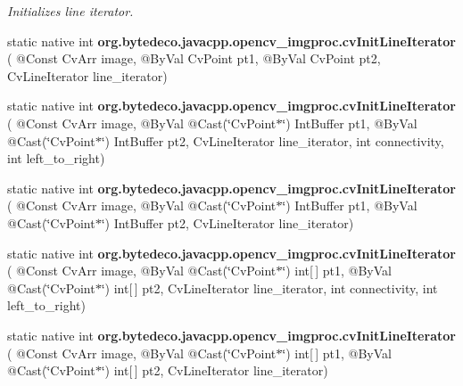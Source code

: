 \begin{DoxyCompactItemize}
\begin{DoxyCompactList}\small\item\em Initializes line iterator. \end{DoxyCompactList}\item 
\mbox{\label{group__imgproc__c_ga90c0091612a5abc5a45bf91675dbde58}} 
static native int {\bfseries org.\+bytedeco.\+javacpp.\+opencv\+\_\+imgproc.\+cv\+Init\+Line\+Iterator} ( @Const Cv\+Arr image, @By\+Val Cv\+Point pt1, @By\+Val Cv\+Point pt2, Cv\+Line\+Iterator line\+\_\+iterator)
\item 
\mbox{\label{group__imgproc__c_gaf96639dddc5c8279e8834a9a41acecb8}} 
static native int {\bfseries org.\+bytedeco.\+javacpp.\+opencv\+\_\+imgproc.\+cv\+Init\+Line\+Iterator} ( @Const Cv\+Arr image, @By\+Val @Cast(\char`\"{}Cv\+Point$\ast$\char`\"{}) Int\+Buffer pt1, @By\+Val @Cast(\char`\"{}Cv\+Point$\ast$\char`\"{}) Int\+Buffer pt2, Cv\+Line\+Iterator line\+\_\+iterator, int connectivity, int left\+\_\+to\+\_\+right)
\item 
\mbox{\label{group__imgproc__c_ga050110d15454b41fbfbdba6b54a084c4}} 
static native int {\bfseries org.\+bytedeco.\+javacpp.\+opencv\+\_\+imgproc.\+cv\+Init\+Line\+Iterator} ( @Const Cv\+Arr image, @By\+Val @Cast(\char`\"{}Cv\+Point$\ast$\char`\"{}) Int\+Buffer pt1, @By\+Val @Cast(\char`\"{}Cv\+Point$\ast$\char`\"{}) Int\+Buffer pt2, Cv\+Line\+Iterator line\+\_\+iterator)
\item 
\mbox{\label{group__imgproc__c_gac4c7b1bbeb0ee95be85d6bc16db1f0df}} 
static native int {\bfseries org.\+bytedeco.\+javacpp.\+opencv\+\_\+imgproc.\+cv\+Init\+Line\+Iterator} ( @Const Cv\+Arr image, @By\+Val @Cast(\char`\"{}Cv\+Point$\ast$\char`\"{}) int\mbox{[}$\,$\mbox{]} pt1, @By\+Val @Cast(\char`\"{}Cv\+Point$\ast$\char`\"{}) int\mbox{[}$\,$\mbox{]} pt2, Cv\+Line\+Iterator line\+\_\+iterator, int connectivity, int left\+\_\+to\+\_\+right)
\item 
\mbox{\label{group__imgproc__c_ga5b47b353a2c9e9683be08c4d513d0f94}} 
static native int {\bfseries org.\+bytedeco.\+javacpp.\+opencv\+\_\+imgproc.\+cv\+Init\+Line\+Iterator} ( @Const Cv\+Arr image, @By\+Val @Cast(\char`\"{}Cv\+Point$\ast$\char`\"{}) int\mbox{[}$\,$\mbox{]} pt1, @By\+Val @Cast(\char`\"{}Cv\+Point$\ast$\char`\"{}) int\mbox{[}$\,$\mbox{]} pt2, Cv\+Line\+Iterator line\+\_\+iterator)

\end{DoxyCompactItemize}
